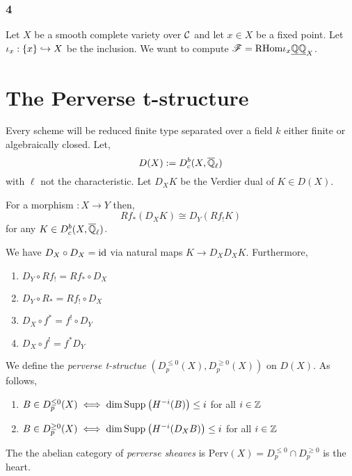 \documentclass[12pt]{article}
\begin{document}
\subsubsection*{4}

Let $X$ be a smooth complete variety over $\mathbb{\mathcal{C}}$ and let $x \in X$ be a fixed point. Let $\iota_x : \{ x \} \hookrightarrow X$ be the inclusion. We want to compute $\mathscr{F} = \mathrm{RHom}{}{\iota_x \underline{\mathbb{Q}}}{\underline{\mathbb{Q}}_X}$.

\newcommand{\Perv}[1]{\mathrm{Perv}\left( #1 \right)}

\newcommand{\RHom}[3]{\mathrm{RHom}_{#1} \left( #2, #3 \right)}


\section{The Perverse t-structure}

Every scheme will be reduced finite type separated over a field $k$ either finite or algebraically closed. Let,
\[ D(X) := D_c^b(X, \overline{\mathbb{Q}}_\ell) \]
with $\ell$ not the characteristic. Let $D_X K$ be the Verdier dual of $K \in D(X)$.

\begin{prop}
For a morphism $ : X \to Y$ then,
\[ Rf_* (D_X K) \cong D_Y (Rf_! K) \]
for any $K \in D_c^b(X, \overline{\mathbb{Q}}_\ell)$. 
\end{prop}

\begin{prop}[Biduality]
We have $D_X \circ D_X = \mathrm{id}$ via natural maps $K \to D_X D_X K$. Furthermore,
\begin{enumerate}
\item $D_Y \circ R f_! = Rf_* \circ D_X$
\item $D_Y \circ R _* = R f_! \circ D_X$
\item $D_X \circ f^* = f^! \circ D_Y$
\item $D_X \circ f^! = f^* D_Y$
\end{enumerate}
\end{prop}

\begin{defn}
We define the \textit{perverse t-structue} $(D_p^{\le 0}(X), D_p^{\ge 0}(X))$ on $D(X)$. As follows,
\begin{enumerate}
\item $B \in D_p^{\le 0}(X) \iff \dim \mathrm{Supp}_{} \left( H^{-i}(B) \right) \le i$ for all $i \in \mathbb{Z}$
\item $B \in D_p^{\ge 0}(X) \iff \dim \mathrm{Supp}_{} \left( H^{-i} (D_X B) \right) \le i$ for all $i \in \mathbb{Z}$
\end{enumerate}
The the abelian category of \textit{perverse sheaves} is $\Perv{X} = D_p^{\le 0} \cap D_p^{\ge 0}$ is the heart. 
\end{defn}
\end{document}
